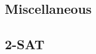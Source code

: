 \documentclass[9pt]{extarticle}
\begin{document}
\begin{multicols*}{3}
\section{Miscellaneous}
\subsection{2-SAT} %


\end{multicols*}
\end{document}
